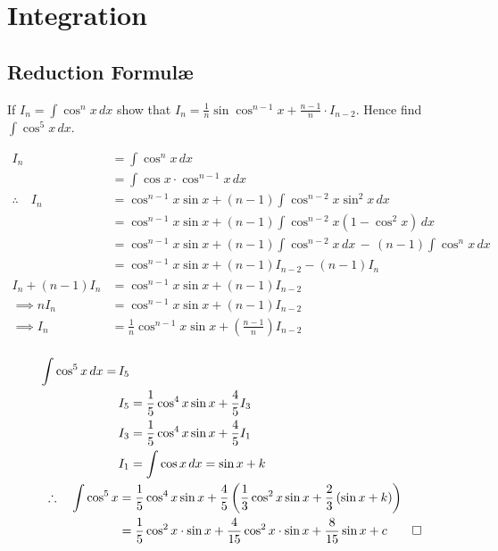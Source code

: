 \documentclass{standalone}
\begin{document}
	\chapter{Integration}
	\section{Reduction Formul\ae}
	
	\begin{example}
		If $I_n = \int \cos^n x \, dx$ show that $I_n = \frac{1}{n} \sin\cos^{n-1}x + \frac{n-1}{n}\cdot I_{n-2}$. Hence find $\int \cos^5x\, dx$.
	\end{example}
	
	\begin{align*}
							I_n  & = \int \cos^n x \, dx\\
								 & = \int \cos x \cdot \cos^{n-1}x\, dx\\
			\therefore \quad I_n & = \cos^{n-1}x\sin x + (n-1)\int\cos^{n-2}x\sin^2x\,dx\\
								 & = \cos^{n-1}x\sin x + (n-1)\int\cos^{n-2}x(1-\cos^2x)\,dx\\
								 & = \cos^{n-1}x\sin x + (n-1)\int\cos^{n-2}x \, dx \,-\, (n-1)\int\cos^nx\,dx\\
								 & = \cos^{n-1}x\sin x + (n-1)I_{n-2} - (n-1)I_n\\
				  I_n + (n-1)I_n & = \cos^{n-1}x\sin x + (n-1)I_{n-2}\\
			      \implies  nI_n & = \cos^{n-1}x\sin x + (n-1)I_{n-2}\\
				\implies I_n     & = \frac1n\cos^{n-1}x\sin x + \left(\frac{n-1}n\right)I_{n-2}\\
	\end{align*}

	\begin{align*}
			\int \cos^5 x \, dx   =\,  & I_5\\
							  	       & I_5 = \frac{1}{5} \cos^4x\sin x + \frac45I_3\\
	                                   & I_3 = \frac{1}{5} \cos^4x\sin x + \frac{4}{5}I_1\\
									   & I_1 = \int \cos x \, dx = \sin x + k\\
		\therefore \quad \int \cos^5 x & = \frac{1}{5}\cos^4x \sin x + \frac{4}{5}\left(\frac{1}{3}\cos^2x\sin x + \frac{2}{3}\left(\sin x + k\right)\right)\\
		                               & =\frac{1}{5}\cos^2x\cdot\sin x + \frac4{15} \cos^2 x \cdot \sin x + \frac{8}{15}\sin x + c   \qed                    
	\end{align*}	  						
	
\end{document}
